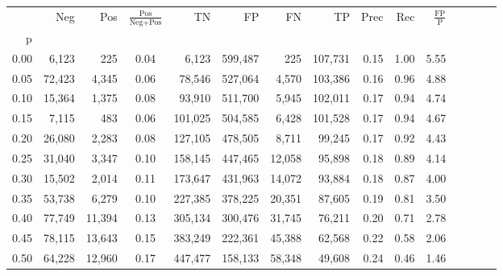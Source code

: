 \begin{tabular}{rrrcrrrrrrrrrrr}
\toprule
{} &     Neg &     Pos & $\frac{\text{Pos}}{\text{Neg}+\text{Pos}}$ &       TN &       FP &       FN &       TP &  Prec &   Rec & $\frac{\text{FP}}{\text{P}}$ \\
p    &         &         &                                            &          &          &          &          &       &       &                              \\
\midrule
0.00 &   6,123 &     225 &                                       0.04 &    6,123 &  599,487 &      225 &  107,731 &  0.15 &  1.00 &                         5.55 \\
0.05 &  72,423 &   4,345 &                                       0.06 &   78,546 &  527,064 &    4,570 &  103,386 &  0.16 &  0.96 &                         4.88 \\
0.10 &  15,364 &   1,375 &                                       0.08 &   93,910 &  511,700 &    5,945 &  102,011 &  0.17 &  0.94 &                         4.74 \\
0.15 &   7,115 &     483 &                                       0.06 &  101,025 &  504,585 &    6,428 &  101,528 &  0.17 &  0.94 &                         4.67 \\
0.20 &  26,080 &   2,283 &                                       0.08 &  127,105 &  478,505 &    8,711 &   99,245 &  0.17 &  0.92 &                         4.43 \\
0.25 &  31,040 &   3,347 &                                       0.10 &  158,145 &  447,465 &   12,058 &   95,898 &  0.18 &  0.89 &                         4.14 \\
0.30 &  15,502 &   2,014 &                                       0.11 &  173,647 &  431,963 &   14,072 &   93,884 &  0.18 &  0.87 &                         4.00 \\
0.35 &  53,738 &   6,279 &                                       0.10 &  227,385 &  378,225 &   20,351 &   87,605 &  0.19 &  0.81 &                         3.50 \\
0.40 &  77,749 &  11,394 &                                       0.13 &  305,134 &  300,476 &   31,745 &   76,211 &  0.20 &  0.71 &                         2.78 \\
0.45 &  78,115 &  13,643 &                                       0.15 &  383,249 &  222,361 &   45,388 &   62,568 &  0.22 &  0.58 &                         2.06 \\
0.50 &  64,228 &  12,960 &                                       0.17 &  447,477 &  158,133 &   58,348 &   49,608 &  0.24 &  0.46 &                         1.46 \\

\end{tabular}
